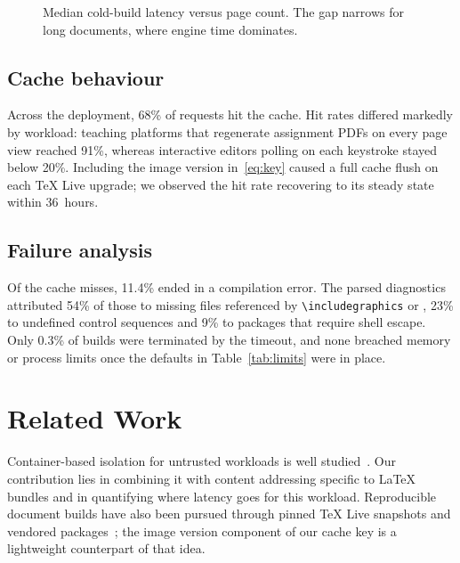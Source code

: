 \documentclass[journal]{IEEEtran}
\begin{document}
\begin{figure}[!t]
  \centering
  \caption{Median cold-build latency versus page count. The gap narrows for
    long documents, where engine time dominates.}
  \label{fig:latency}
\end{figure}

\subsection{Cache behaviour}
Across the deployment, 68\% of requests hit the cache. Hit rates differed
markedly by workload: teaching platforms that regenerate assignment PDFs on
every page view reached 91\%, whereas interactive editors polling on each
keystroke stayed below 20\%. Including the image version in~\eqref{eq:key}
caused a full cache flush on each \TeX{} Live upgrade; we observed the hit
rate recovering to its steady state within 36~hours.

\subsection{Failure analysis}
Of the cache misses, 11.4\% ended in a compilation error. The parsed
diagnostics attributed 54\% of those to missing files referenced by
\verb|\includegraphics| or \verb||, 23\% to undefined control
sequences and 9\% to packages that require shell escape. Only 0.3\% of
builds were terminated by the timeout, and none breached memory or process
limits once the defaults in Table~\ref{tab:limits} were in place.

\section{Related Work}
\label{sec:related}
Container-based isolation for untrusted workloads is well
studied~\cite{merkel2014docker,nist2017container}. Our contribution lies in
combining it with content addressing specific to \LaTeX{} bundles and in
quantifying where latency goes for this workload. Reproducible document
builds have also been pursued through pinned \TeX{} Live snapshots and
vendored packages~\cite{knuth1986texbook}; the image version component of
our cache key is a lightweight counterpart of that idea.
\end{document}
